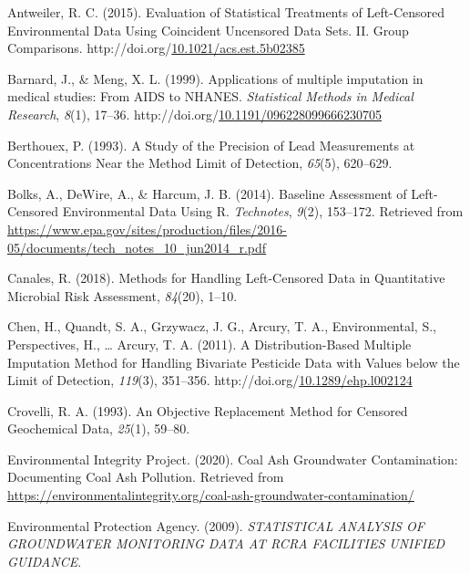 \documentclass[12pt, twoside]{amherstthesis}
\newenvironment{CSLReferences}%
  {}%
  {\par}
\begin{document}
\hypertarget{refs}{}
\begin{CSLReferences}{1}{0}
\leavevmode\hypertarget{ref-Antweiler2015}{}%
Antweiler, R. C. (2015). {Evaluation of Statistical Treatments of Left-Censored Environmental Data Using Coincident Uncensored Data Sets. II. Group Comparisons}. http://doi.org/\href{https://doi.org/10.1021/acs.est.5b02385}{10.1021/acs.est.5b02385}

\leavevmode\hypertarget{ref-Barnard1999}{}%
Barnard, J., \& Meng, X. L. (1999). {Applications of multiple imputation in medical studies: From AIDS to NHANES}. \emph{Statistical Methods in Medical Research}, \emph{8}(1), 17--36. http://doi.org/\href{https://doi.org/10.1191/096228099666230705}{10.1191/096228099666230705}

\leavevmode\hypertarget{ref-Berthouex1993}{}%
Berthouex, P. (1993). {A Study of the Precision of Lead Measurements at Concentrations Near the Method Limit of Detection}, \emph{65}(5), 620--629.

\leavevmode\hypertarget{ref-Bolks2014}{}%
Bolks, A., DeWire, A., \& Harcum, J. B. (2014). {Baseline Assessment of Left-Censored Environmental Data Using R}. \emph{Technotes}, \emph{9}(2), 153--172. Retrieved from \url{https://www.epa.gov/sites/production/files/2016-05/documents/tech_notes_10_jun2014_r.pdf}

\leavevmode\hypertarget{ref-Canales2018}{}%
Canales, R. (2018). {Methods for Handling Left-Censored Data in Quantitative Microbial Risk Assessment}, \emph{84}(20), 1--10.

\leavevmode\hypertarget{ref-Chen2011}{}%
Chen, H., Quandt, S. A., Grzywacz, J. G., Arcury, T. A., Environmental, S., Perspectives, H., \ldots{} Arcury, T. A. (2011). {A Distribution-Based Multiple Imputation Method for Handling Bivariate Pesticide Data with Values below the Limit of Detection}, \emph{119}(3), 351--356. http://doi.org/\href{https://doi.org/10.1289/ehp.l002124}{10.1289/ehp.l002124}

\leavevmode\hypertarget{ref-Crovelli1993}{}%
Crovelli, R. A. (1993). {An Objective Replacement Method for Censored Geochemical Data}, \emph{25}(1), 59--80.

\leavevmode\hypertarget{ref-EIP2020}{}%
Environmental Integrity Project. (2020). {Coal Ash Groundwater Contamination: Documenting Coal Ash Pollution}. Retrieved from \url{https://environmentalintegrity.org/coal-ash-groundwater-contamination/}

\leavevmode\hypertarget{ref-EPA2009}{}%
Environmental Protection Agency. (2009). \emph{{STATISTICAL ANALYSIS OF GROUNDWATER MONITORING DATA AT RCRA FACILITIES UNIFIED GUIDANCE}}.


\end{CSLReferences}
\end{document}
